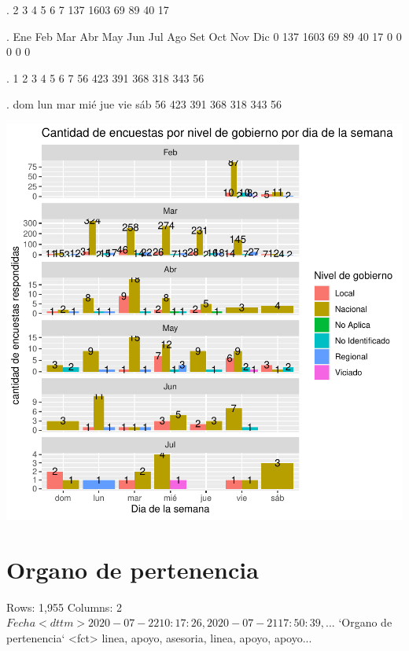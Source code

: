 \documentclass{article}
\begin{document}
\begin{Schunk}
\begin{Soutput}
.
   2    3    4    5    6    7 
 137 1603   69   89   40   17 
\end{Soutput}
\begin{Soutput}
.
 Ene  Feb  Mar  Abr  May  Jun  Jul  Ago  Set  Oct  Nov  Dic 
   0  137 1603   69   89   40   17    0    0    0    0    0 
\end{Soutput}
\begin{Soutput}
.
  1   2   3   4   5   6   7 
 56 423 391 368 318 343  56 
\end{Soutput}
\begin{Soutput}
.
dom lun mar mié jue vie sáb 
 56 423 391 368 318 343  56 
\end{Soutput}
\end{Schunk}
\includegraphics{seguimientov4-012}


\section{Organo de pertenencia}

\begin{Schunk}
\begin{Soutput}
Rows: 1,955
Columns: 2
$ Fecha                   <dttm> 2020-07-22 10:17:26, 2020-07-21 17:50:39, ...
$ `Organo de pertenencia` <fct> linea, apoyo, asesoria, linea, apoyo, apoyo...
\end{Soutput}
\end{Schunk}
\end{document}
